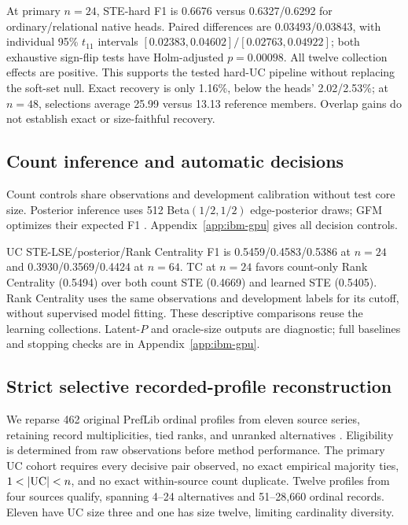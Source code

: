 At primary $n=24$, STE-hard F1 is 0.6676 versus 0.6327/0.6292 for ordinary/relational native heads. Paired differences are 0.03493/0.03843, with individual 95\% $t_{11}$ intervals $[0.02383,0.04602]/[0.02763,0.04922]$; both exhaustive sign-flip tests have Holm-adjusted $p=0.00098$. All twelve collection effects are positive. This supports the tested hard-UC pipeline without replacing the soft-set null. Exact recovery is only 1.16\%, below the heads' 2.02/2.53\%; at $n=48$, selections average 25.99 versus 13.13 reference members. Overlap gains do not establish exact or size-faithful recovery.

\subsection{Count inference and automatic decisions}\label{sec:counts}
Count controls share observations and development calibration without test core size. Posterior inference uses 512 Beta$(1/2,1/2)$ edge-posterior draws; GFM optimizes their expected F1 \citep{waegeman2014fmeasure}. Appendix~\ref{app:ibm-gpu} gives all decision controls.

UC STE-LSE/posterior/Rank Centrality F1 is 0.5459/0.4583/0.5386 at $n=24$ and 0.3930/0.3569/0.4424 at $n=64$. TC at $n=24$ favors count-only Rank Centrality (0.5494) over both count STE (0.4669) and learned STE (0.5405). Rank Centrality uses the same observations and development labels for its cutoff, without supervised model fitting. These descriptive comparisons reuse the learning collections. Latent-$P$ and oracle-size outputs are diagnostic; full baselines and stopping checks are in Appendix~\ref{app:ibm-gpu}.

\subsection{Strict selective recorded-profile reconstruction}\label{sec:profiles}
We reparse 462 original PrefLib ordinal profiles from eleven source series, retaining record multiplicities, tied ranks, and unranked alternatives \citep{mattei2013preflib}. Eligibility is determined from raw observations before method performance. The primary UC cohort requires every decisive pair observed, no exact empirical majority ties, $1<|\UC|<n$, and no exact within-source count duplicate. Twelve profiles from four sources qualify, spanning 4--24 alternatives and 51--28,660 ordinal records. Eleven have UC size three and one has size twelve, limiting cardinality diversity.

